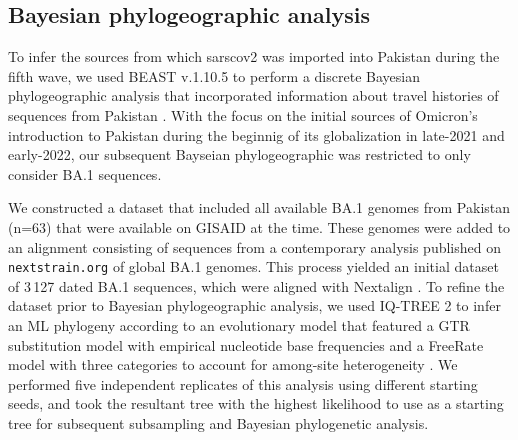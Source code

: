 \subsection{Bayesian phylogeographic analysis}\label{2:mm-beast}
To infer the sources from which \gls{sarscov2} was imported into Pakistan during the fifth wave, we used BEAST v.1.10.5 \citep{suchard2018bayesian} to perform a discrete Bayesian phylogeographic analysis \citep{lemey2009bayesian} that incorporated information about travel histories of sequences from Pakistan \citep{lemey2020accommodating}.
With the focus on the initial sources of Omicron's introduction to Pakistan during the beginnig of its globalization in late-2021 and early-2022, our subsequent Bayseian phylogeographic was restricted to only consider BA.1 sequences.

We constructed a dataset that included all available BA.1 genomes from Pakistan (n=63) that were available on GISAID at the time.
These genomes were added to an alignment consisting of sequences from a contemporary analysis published on \verb|nextstrain.org| \citep{hadfield2018nextstrain} of global BA.1 genomes.
This process yielded an initial dataset of 3\,127 dated BA.1 sequences, which were aligned with Nextalign \citep{aksamentov2021nextclade}.
To refine the dataset prior to Bayesian phylogeographic analysis, we used IQ-TREE 2 \citep{minh2020iq} to infer an ML phylogeny according to an evolutionary model that featured a GTR substitution model with empirical nucleotide base frequencies and a FreeRate model with three categories to account for among-site heterogeneity \citep{yang1995space, soubrier2012influence}.
We performed five independent replicates of this analysis using different starting seeds, and took the resultant tree with the highest likelihood to use as a starting tree for subsequent subsampling and Bayesian phylogenetic analysis.

